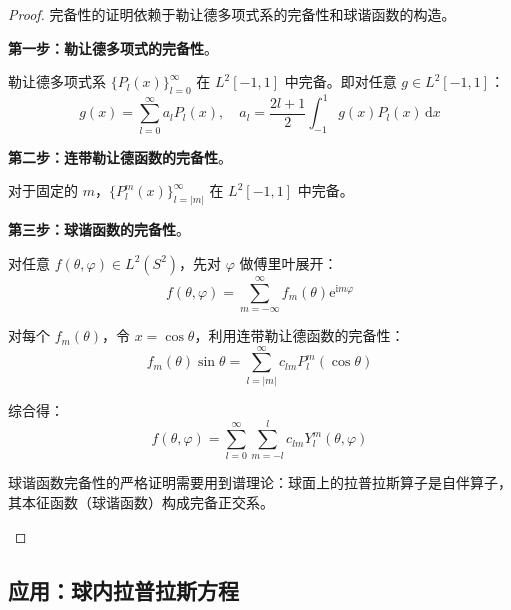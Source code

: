 \begin{proof}
完备性的证明依赖于勒让德多项式系的完备性和球谐函数的构造。

\textbf{第一步：勒让德多项式的完备性}。

勒让德多项式系 $\{P_l(x)\}_{l=0}^{\infty}$ 在 $L^2[-1, 1]$ 中完备。即对任意 $g \in L^2[-1, 1]$：
\begin{equation}
    g(x) = \sum_{l=0}^{\infty} a_l P_l(x), \quad a_l = \frac{2l+1}{2}\int_{-1}^1 g(x)P_l(x)\,\mathrm{d}x
\end{equation}

\textbf{第二步：连带勒让德函数的完备性}。

对于固定的 $m$，$\{P_l^m(x)\}_{l=|m|}^{\infty}$ 在 $L^2[-1, 1]$ 中完备。

\textbf{第三步：球谐函数的完备性}。

对任意 $f(\theta, \varphi) \in L^2(S^2)$，先对 $\varphi$ 做傅里叶展开：
\begin{equation}
    f(\theta, \varphi) = \sum_{m=-\infty}^{\infty} f_m(\theta)\mathrm{e}^{\mathrm{i}m\varphi}
\end{equation}

对每个 $f_m(\theta)$，令 $x = \cos\theta$，利用连带勒让德函数的完备性：
\begin{equation}
    f_m(\theta)\sin\theta = \sum_{l=|m|}^{\infty} c_{lm}P_l^m(\cos\theta)
\end{equation}

综合得：
\begin{equation}
    f(\theta, \varphi) = \sum_{l=0}^{\infty}\sum_{m=-l}^{l} c_{lm}Y_l^m(\theta, \varphi)
\end{equation}

\begin{tishi}
球谐函数完备性的严格证明需要用到谱理论：球面上的拉普拉斯算子是自伴算子，其本征函数（球谐函数）构成完备正交系。
\end{tishi}
\end{proof}

\subsection{应用：球内拉普拉斯方程}

